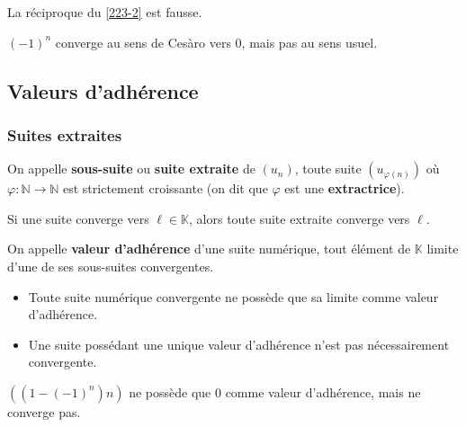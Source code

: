 	\begin{remark}
		La réciproque du \cref{223-2} est fausse.
	\end{remark}
	
	\begin{example}
		$(-1)^n$ converge au sens de Cesàro vers $0$, mais pas au sens usuel.
	\end{example}
	
	\subsection{Valeurs d'adhérence}
	
	\subsubsection{Suites extraites}
	
	
	\begin{definition}
		On appelle \textbf{sous-suite} ou \textbf{suite extraite} de $(u_n)$, toute suite $(u_{\varphi(n)})$ où $\varphi : \mathbb{N} \rightarrow \mathbb{N}$ est strictement croissante (on dit que $\varphi$ est une \textbf{extractrice}).
	\end{definition}
	
	\begin{proposition}
		Si une suite converge vers $\ell \in \mathbb{K}$, alors toute suite extraite converge vers $\ell$.
	\end{proposition}
	
	\begin{definition}
		On appelle \textbf{valeur d'adhérence} d'une suite numérique, tout élément de $\mathbb{K}$ limite d'une de ses sous-suites convergentes.
	\end{definition}
	
	\begin{remark}
		\begin{itemize}
			\item Toute suite numérique convergente ne possède que sa limite comme valeur d'adhérence.
			\item Une suite possédant une unique valeur d'adhérence n'est pas nécessairement convergente.
		\end{itemize}
	\end{remark}
	
	\begin{example}
		$((1 - (-1)^n)n)$ ne possède que $0$ comme valeur d'adhérence, mais ne converge pas.
	\end{example}
	
